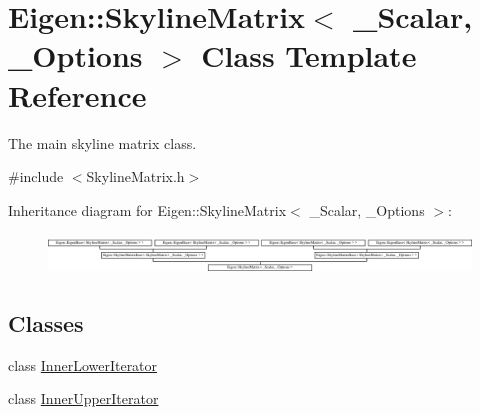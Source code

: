\hypertarget{class_eigen_1_1_skyline_matrix}{}\section{Eigen\+:\+:Skyline\+Matrix$<$ \+\_\+\+Scalar, \+\_\+\+Options $>$ Class Template Reference}
\label{class_eigen_1_1_skyline_matrix}


The main skyline matrix class.  




{\ttfamily \#include $<$Skyline\+Matrix.\+h$>$}

Inheritance diagram for Eigen\+:\+:Skyline\+Matrix$<$ \+\_\+\+Scalar, \+\_\+\+Options $>$\+:\begin{figure}[H]
\begin{center}
\leavevmode
\includegraphics[height=1.079692cm]{class_eigen_1_1_skyline_matrix}
\end{center}
\end{figure}
\subsection*{Classes}
\begin{DoxyCompactItemize}
\item 
class \hyperlink{class_eigen_1_1_skyline_matrix_1_1_inner_lower_iterator}{Inner\+Lower\+Iterator}
\item 
class \hyperlink{class_eigen_1_1_skyline_matrix_1_1_inner_upper_iterator}{Inner\+Upper\+Iterator}
\end{DoxyCompactItemize}
